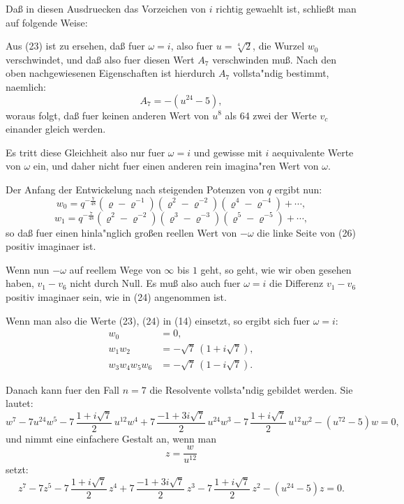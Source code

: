 \documentclass[12pt,a4paper]{article}
\theoremstyle{plain}
\theoremstyle{definition}
\theoremstyle{remark}
\begin{document}
Da\ss{} in diesen Ausdruecken das Vorzeichen von $i$ richtig gewaehlt ist, schlie\ss{}t man auf folgende Weise:

Aus (23) ist zu ersehen, da\ss{} fuer $\omega = i$, also fuer $u = \sqrt[4]{2}$, die Wurzel $w_0$ verschwindet, und da\ss{} also fuer diesen Wert $A_7$ verschwinden mu\ss{}. Nach den oben nachgewiesenen Eigenschaften ist hierdurch $A_7$ vollsta"ndig bestimmt, naemlich:
\begin{equation}\label{eq:133_25}
A_7 = -(u^{24} - 5),
\end{equation}
woraus folgt, da\ss{} fuer keinen anderen Wert von $u^8$ als 64 zwei der Werte $v_c$ einander gleich werden.

Es tritt diese Gleichheit also nur fuer $\omega = i$ und gewisse mit $i$ aequivalente Werte von $\omega$ ein, und daher nicht fuer einen anderen rein imagina"ren Wert von $\omega$.

Der Anfang der Entwickelung nach steigenden Potenzen von $q$ ergibt nun:
\[
w_0 = q^{-\frac{7}{48}} (\varrho - \varrho^{-1})(\varrho^2 - \varrho^{-2})(\varrho^4 - \varrho^{-4}) + \cdots,
\]
\[
w_1 = q^{-\frac{7}{48}} (\varrho^2 - \varrho^{-2})(\varrho^3 - \varrho^{-3})(\varrho^5 - \varrho^{-5}) + \cdots,
\]
so da\ss{} fuer einen hinla"nglich gro\ss{}en reellen Wert von $-\omega$ die linke Seite von (26) positiv imaginaer ist.

Wenn nun $-\omega$ auf reellem Wege von $\infty$ bis $1$ geht, so geht, wie wir oben gesehen haben, $v_1 - v_6$ nicht durch Null. Es mu\ss{} also auch fuer $\omega = i$ die Differenz $v_1 - v_6$ positiv imaginaer sein, wie in (24) angenommen ist.

Wenn man also die Werte (23), (24) in (14) einsetzt, so ergibt sich fuer $\omega = i$:
\begin{equation}\label{eq:133_27}
\begin{aligned}
w_0 &= 0, \\
w_1 w_2 &= -\sqrt{7}\, (1 + i\sqrt{7}), \\
w_3 w_4 w_5 w_6 &= -\sqrt{7}\, (1 - i\sqrt{7}).
\end{aligned}
\end{equation}

Danach kann fuer den Fall $n = 7$ die Resolvente vollsta"ndig gebildet werden. Sie lautet:
\begin{equation}\label{eq:133_28}
w^7 - 7u^{24} w^5 - 7\, \frac{1 + i\sqrt{7}}{2}\, u^{12} w^4 + 7\, \frac{-1 + 3i\sqrt{7}}{2}\, u^{24} w^3 - 7\, \frac{1 + i\sqrt{7}}{2}\, u^{12} w^2 - (u^{72} - 5)w = 0,
\end{equation}
und nimmt eine einfachere Gestalt an, wenn man
\[
z = \frac{w}{u^{12}}
\]
setzt:
\begin{equation}\label{eq:133_29}
z^7 - 7z^5 - 7\, \frac{1 + i\sqrt{7}}{2}\, z^4 + 7\, \frac{-1 + 3i\sqrt{7}}{2}\, z^3 - 7\, \frac{1 + i\sqrt{7}}{2}\, z^2 - (u^{24} - 5)z = 0.
\end{equation}
\end{document}
